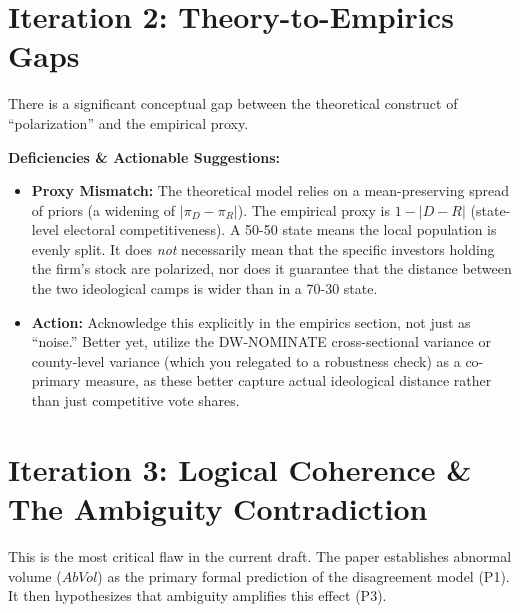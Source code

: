 \documentclass[12pt]{article}
\begin{document}

\section{Iteration 2: Theory-to-Empirics Gaps}

There is a significant conceptual gap between the theoretical construct of ``polarization'' and the empirical proxy.

\textbf{Deficiencies \& Actionable Suggestions:}
\begin{itemize}
    \item \textbf{Proxy Mismatch:} The theoretical model relies on a mean-preserving spread of priors (a widening of $|\pi_D - \pi_R|$). The empirical proxy is $1 - |D-R|$ (state-level electoral competitiveness). A 50-50 state means the local population is evenly split. It does \textit{not} necessarily mean that the specific investors holding the firm's stock are polarized, nor does it guarantee that the distance between the two ideological camps is wider than in a 70-30 state.
    \item \textbf{Action:} Acknowledge this explicitly in the empirics section, not just as ``noise.'' Better yet, utilize the DW-NOMINATE cross-sectional variance or county-level variance (which you relegated to a robustness check) as a co-primary measure, as these better capture actual ideological distance rather than just competitive vote shares.
\end{itemize}


\section{Iteration 3: Logical Coherence \& The Ambiguity Contradiction}

This is the most critical flaw in the current draft. The paper establishes abnormal volume ($AbVol$) as the primary formal prediction of the disagreement model (P1). It then hypothesizes that ambiguity amplifies this effect (P3). 
\end{document}
